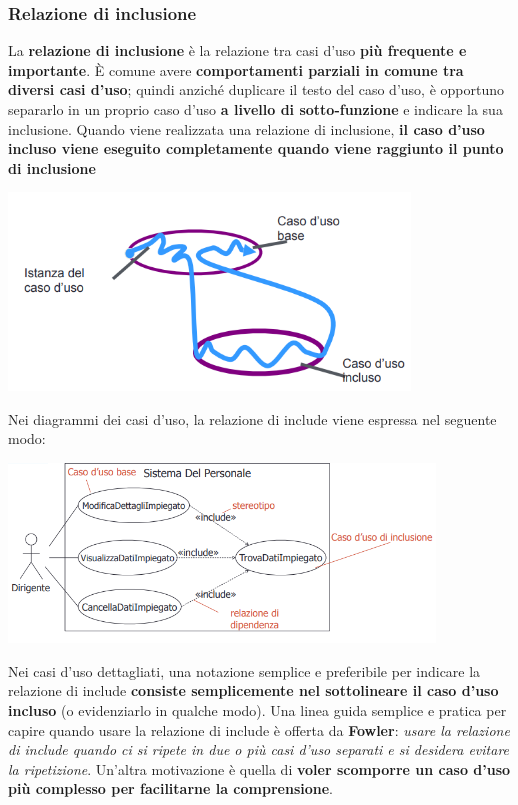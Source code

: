 \documentclass[12pt]{article}
\begin{document}
\subsubsection{Relazione di inclusione}
La \textbf{relazione di inclusione} è la relazione tra casi d'uso \textbf{più frequente e importante}.
È comune avere \textbf{comportamenti parziali in comune tra diversi casi d'uso}; quindi anziché duplicare il testo del caso d'uso, è opportuno separarlo in un proprio caso d'uso \textbf{a livello di sotto-funzione} e indicare la sua inclusione.
Quando viene realizzata una relazione di inclusione, \textbf{il caso d'uso incluso viene eseguito completamente quando viene raggiunto il punto di inclusione}
\begin{center}
    \includegraphics[width = 0.80\textwidth]{Images/42.png}
\end{center}
Nei diagrammi dei casi d'uso, la relazione di include viene espressa nel seguente modo:
\begin{center}
    \includegraphics[width = 0.85\textwidth]{Images/43.png}
\end{center}
Nei casi d'uso dettagliati, una notazione semplice e preferibile per indicare la relazione di include \textbf{consiste semplicemente nel sottolineare il caso d'uso incluso} (o evidenziarlo in qualche modo).
Una linea guida semplice e pratica per capire quando usare la relazione di include è offerta da \textbf{Fowler}: \textit{usare la relazione di include quando ci si ripete in due o più casi d'uso separati e si desidera evitare la ripetizione}.
Un'altra motivazione è quella di \textbf{voler scomporre un caso d'uso più complesso per facilitarne la comprensione}.
\end{document}
